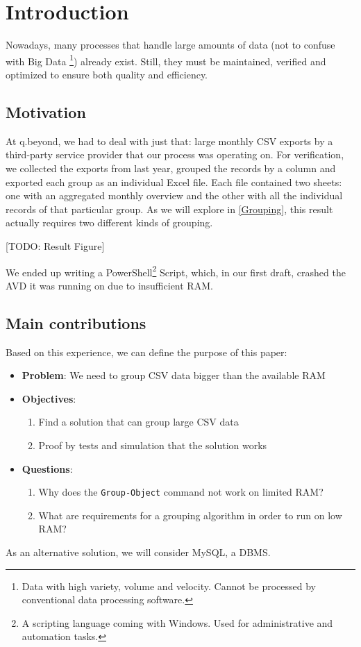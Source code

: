 \setcounter{page}{1}
\pagestyle{fancy}
\fancyhf{}
\fancyhead[R]{\thepage}
\renewcommand{\headrulewidth}{0pt} %

\section{Introduction}
Nowadays, many processes that handle large amounts of data (not to confuse with Big Data
\footnote{Data with high variety, volume and velocity. Cannot be processed by conventional data processing software.})
already exist. Still, they must be maintained, verified and optimized to ensure both
quality and efficiency.

\subsection{Motivation}
At q.beyond, we had to deal with just that: large monthly CSV exports by a third-party service provider
that our process was operating on. For verification, we collected the exports from last year,
grouped the records by a column and exported each group as an individual Excel file.
Each file contained two sheets: one with an aggregated monthly overview and the other with all the
individual records of that particular group. As we will explore in \ref{Grouping}, this
result actually requires two different kinds of grouping.

[TODO: Result Figure]

We ended up writing a PowerShell\footnote{A scripting language coming with Windows. Used for administrative and automation tasks.}
Script, which, in our first draft, crashed the \gls{AVD}
it was running on due to insufficient \gls{RAM}.

\subsection{Main contributions}
Based on this experience, we can define the purpose of this paper:
\begin{itemize}
    \item \textbf{Problem}: We need to group CSV data bigger than the available RAM
    \item \textbf{Objectives}:
    \begin{enumerate}
        \item Find a solution that can group large CSV data
        \item Proof by tests and simulation that the solution works
    \end{enumerate}
    \item \textbf{Questions}:
    \begin{enumerate}
        \item Why does the \verb+Group-Object+ command not work on limited RAM?
        \item What are requirements for a grouping algorithm in order to run on low RAM?
    \end{enumerate}
\end{itemize}
As an alternative solution, we will consider MySQL, a \gls{DBMS}.

